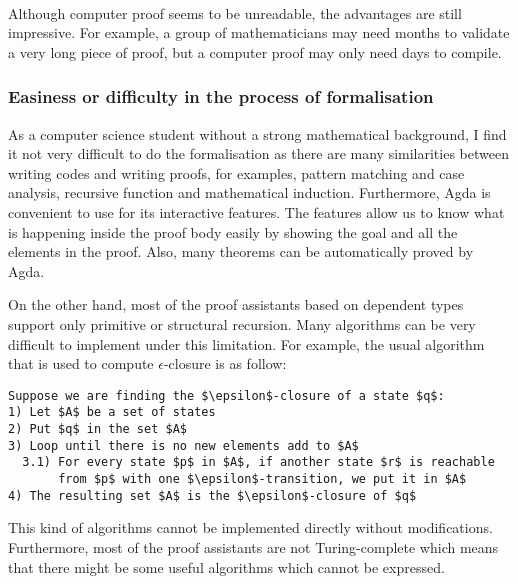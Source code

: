 \paragraph{} Although computer proof seems to be unreadable, the advantages
are still impressive. For example, a group
of mathematicians may need months to validate a very long piece of
proof, but a computer proof may only need days to
compile. 


\subsubsection{Easiness or difficulty in the process of formalisation}
\par As a computer science student without a strong mathematical
background, I find it not very difficult to do the
formalisation as there are many similarities between writing codes and writing
proofs, for examples, pattern matching and case analysis, recursive
function and mathematical induction. Furthermore, Agda is convenient
to use for its interactive features. The features allow us to know
what is happening inside the proof body easily by showing the goal and all the
elements in the proof. Also, many theorems can be automatically proved
by Agda. 
\par On the other hand, most of the
proof assistants based on dependent types support only primitive or
structural recursion. Many algorithms can be very difficult to
implement under this limitation. For example, the usual algorithm that is used to compute
\(\epsilon\)-closure is as follow:
\begin{lstlisting}[mathescape=true,xleftmargin=.3\textwidth]
Suppose we are finding the $\epsilon$-closure of a state $q$:
1) Let $A$ be a set of states
2) Put $q$ in the set $A$
3) Loop until there is no new elements add to $A$
  3.1) For every state $p$ in $A$, if another state $r$ is reachable
       from $p$ with one $\epsilon$-transition, we put it in $A$
4) The resulting set $A$ is the $\epsilon$-closure of $q$
\end{lstlisting} 
\par This kind of algorithms cannot be implemented directly without
modifications. Furthermore, most of the proof assistants are
not Turing-complete which means that there
might be some useful algorithms which cannot be expressed. 


